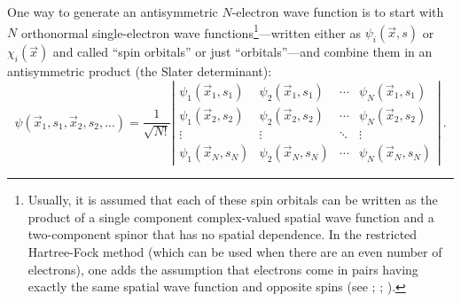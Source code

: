 \documentclass[onecolumn,secnumarabic,amsmath,amssymb,balancelastpage,nofootinbib]{article}
\begin{document}
One way to generate an antisymmetric $N$-electron wave function is to start with $N$ orthonormal single-electron wave functions\footnote{Usually, it is assumed that each of these spin orbitals can be written as the product of a single component complex-valued spatial wave function and a two-component spinor that has no spatial dependence.  In the restricted Hartree-Fock method (which can be used when there are an even number of electrons), one adds the assumption that electrons come in pairs having exactly the same spatial wave function and opposite spins (see \cite[ch.\ 3]{szaboQC}; \cite[pg.\ 12]{parryang}; \cite[sec.\ 7.17]{atkins2011}).}---written either as $\psi_i(\vec{x},s)$ or $\chi_i(\vec{x})$ and called ``spin orbitals'' or just ``orbitals''---and combine them in an antisymmetric product (the Slater determinant):
\begin{equation}
\psi(\vec{x}_1, s_1,\vec{x}_2, s_2, ...)=\frac{1}{\sqrt{N!}} \left| \begin{matrix}
\psi_1(\vec{x}_1, s_1) & \psi_2(\vec{x}_1, s_1) & \cdots & \psi_N(\vec{x}_1, s_1)\\
\psi_1(\vec{x}_2, s_2) & \psi_2(\vec{x}_2, s_2) & \cdots & \psi_N(\vec{x}_2, s_2)\\
\vdots & \vdots & \ddots & \vdots\\
\psi_1(\vec{x}_N, s_N) & \psi_2(\vec{x}_N, s_N) & \cdots & \psi_N(\vec{x}_N, s_N)
\end{matrix} \right|
\ .
\label{slaterdeterminant}
\end{equation}
\end{document}
